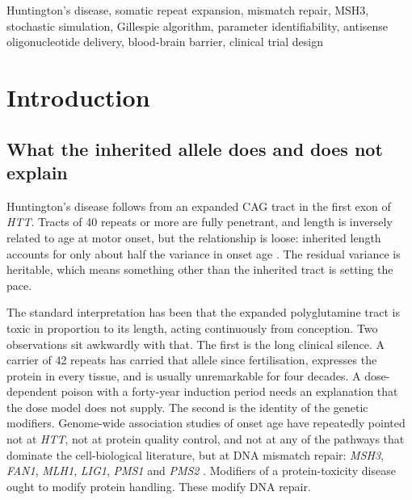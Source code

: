 \documentclass[conference]{IEEEtran}
\begin{document}
\begin{IEEEkeywords}
Huntington's disease, somatic repeat expansion, mismatch repair, MSH3, stochastic simulation, Gillespie algorithm, parameter identifiability, antisense oligonucleotide delivery, blood-brain barrier, clinical trial design
\end{IEEEkeywords}

\section{Introduction}
\label{sec:1}
\subsection{What the inherited allele does and does not explain}
\label{sec:1.1}
Huntington's disease follows from an expanded CAG tract in the first exon of \textit{HTT}. Tracts of 40 repeats or more are fully penetrant, and length is inversely related to age at motor onset, but the relationship is loose: inherited length accounts for only about half the variance in onset age \cite{orth}. The residual variance is heritable, which means something other than the inherited tract is setting the pace.

The standard interpretation has been that the expanded polyglutamine tract is toxic in proportion to its length, acting continuously from conception. Two observations sit awkwardly with that. The first is the long clinical silence. A carrier of 42 repeats has carried that allele since fertilisation, expresses the protein in every tissue, and is usually unremarkable for four decades. A dose-dependent poison with a forty-year induction period needs an explanation that the dose model does not supply. The second is the identity of the genetic modifiers. Genome-wide association studies of onset age have repeatedly pointed not at \textit{HTT}, not at protein quality control, and not at any of the pathways that dominate the cell-biological literature, but at DNA mismatch repair: \textit{MSH3}, \textit{FAN1}, \textit{MLH1}, \textit{LIG1}, \textit{PMS1} and \textit{PMS2} \cite{handsaker}. Modifiers of a protein-toxicity disease ought to modify protein handling. These modify DNA repair.
\end{document}
